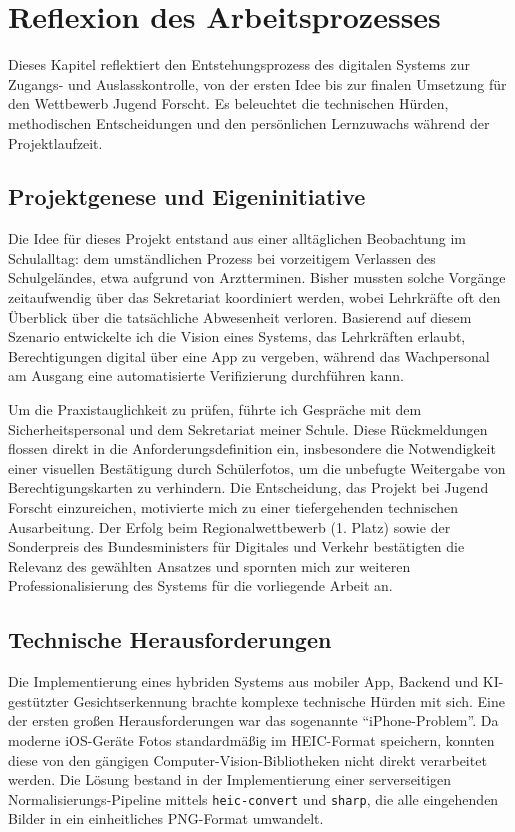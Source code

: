 \section{Reflexion des Arbeitsprozesses}

Dieses Kapitel reflektiert den Entstehungsprozess des digitalen Systems zur Zugangs- und Auslasskontrolle, von der ersten Idee bis zur finalen Umsetzung für den Wettbewerb Jugend Forscht. Es beleuchtet die technischen Hürden, methodischen Entscheidungen und den persönlichen Lernzuwachs während der Projektlaufzeit.

\subsection{Projektgenese und Eigeninitiative}
Die Idee für dieses Projekt entstand aus einer alltäglichen Beobachtung im Schulalltag: dem umständlichen Prozess bei vorzeitigem Verlassen des Schulgeländes, etwa aufgrund von Arztterminen. Bisher mussten solche Vorgänge zeitaufwendig über das Sekretariat koordiniert werden, wobei Lehrkräfte oft den Überblick über die tatsächliche Abwesenheit verloren. Basierend auf diesem Szenario entwickelte ich die Vision eines Systems, das Lehrkräften erlaubt, Berechtigungen digital über eine App zu vergeben, während das Wachpersonal am Ausgang eine automatisierte Verifizierung durchführen kann.

Um die Praxistauglichkeit zu prüfen, führte ich Gespräche mit dem Sicherheitspersonal und dem Sekretariat meiner Schule. Diese Rückmeldungen flossen direkt in die Anforderungsdefinition ein, insbesondere die Notwendigkeit einer visuellen Bestätigung durch Schülerfotos, um die unbefugte Weitergabe von Berechtigungskarten zu verhindern. Die Entscheidung, das Projekt bei Jugend Forscht einzureichen, motivierte mich zu einer tiefergehenden technischen Ausarbeitung. Der Erfolg beim Regionalwettbewerb (1. Platz) sowie der Sonderpreis des Bundesministers für Digitales und Verkehr bestätigten die Relevanz des gewählten Ansatzes und spornten mich zur weiteren Professionalisierung des Systems für die vorliegende Arbeit an.

\subsection{Technische Herausforderungen}
Die Implementierung eines hybriden Systems aus mobiler App, Backend und KI-gestützter Gesichtserkennung brachte komplexe technische Hürden mit sich. Eine der ersten großen Herausforderungen war das sogenannte \enquote{iPhone-Problem}. Da moderne iOS-Geräte Fotos standardmäßig im HEIC-Format speichern, konnten diese von den gängigen Computer-Vision-Bibliotheken nicht direkt verarbeitet werden. Die Lösung bestand in der Implementierung einer serverseitigen Normalisierungs-Pipeline mittels \texttt{heic-convert} und \texttt{sharp}, die alle eingehenden Bilder in ein einheitliches PNG-Format umwandelt.

